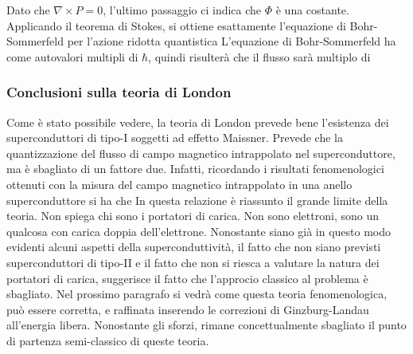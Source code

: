 Dato che $\nabla\times P = 0$, l'ultimo passaggio ci indica che $\Phi$ \`e una costante. Applicando il teorema di Stokes, si ottiene esattamente l'equazione di Bohr-Sommerfeld per l'azione ridotta quantistica
L'equazione di Bohr-Sommerfeld ha come autovalori multipli di $\hbar$, quindi risulter\`a che il flusso sar\`a multiplo di
\subsubsection{Conclusioni sulla teoria di London}
Come \`e stato possibile vedere, la teoria di London prevede bene l'esistenza dei superconduttori di tipo-I soggetti ad effetto Maissner. Prevede che la quantizzazione del flusso di campo magnetico intrappolato nel superconduttore, ma \`e sbagliato di un fattore due. Infatti, ricordando i risultati fenomenologici ottenuti con la misura del campo magnetico intrappolato in una anello superconduttore si ha che 
In questa relazione \`e riassunto il grande limite della teoria. Non spiega chi sono i portatori di carica. Non sono elettroni, sono un qualcosa con carica doppia dell'elettrone. Nonostante siano gi\`a in questo modo evidenti alcuni aspetti della superconduttivit\`a, il fatto che non siano previsti superconduttori di tipo-II e il fatto che non si riesca a valutare la natura dei portatori di carica, suggerisce il fatto che l'approcio classico al problema \`e sbagliato. Nel prossimo paragrafo si vedr\`a come questa teoria fenomenologica, pu\`o essere corretta, e raffinata inserendo le correzioni di Ginzburg-Landau all'energia libera. Nonostante gli sforzi, rimane concettualmente sbagliato il punto di partenza semi-classico di queste teoria.

